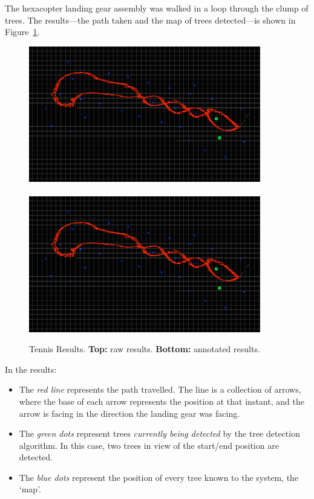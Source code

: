 \documentclass[12pt,oneside,a4paper]{book}
\begin{document}
The hexacopter landing gear assembly was walked in a loop through the
clump of trees. The results---the path taken and the map of trees
detected---is shown in Figure~\ref{fig:tennis-results}. 

\begin{figure}
  \centering
  \includegraphics[width=0.9\textwidth]{figs/tennis-results}\\
  ~\\
  \includegraphics[width=0.9\textwidth]{figs/tennis-results-annotated}
  \caption{Tennis Results. \textbf{Top:} raw results. \textbf{Bottom:}
  annotated results.}
  \label{fig:tennis-results}
\end{figure}

In the results:
\begin{itemize}
\item The \emph{red line} represents the path travelled. The line is a
  collection of arrows, where the base of each arrow represents the
  position at that instant, and the arrow is facing in the direction
  the landing gear was facing.
\item The \emph{green dots} represent trees \emph{currently being
    detected} by the tree detection algorithm. In this case, two trees
  in view of the start/end position are detected.
\item The \emph{blue dots} represent the position of every tree known
  to the system, the `map'.
\end{itemize}
\end{document}
